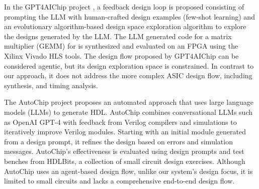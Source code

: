 In the GPT4AIChip project \cite{gpt4aigchip}, a feedback design loop is proposed consisting of prompting the LLM with human-crafted design examples (few-shot learning) and an evolutionary algorithm-based design space exploration algorithm to explore the designs generated by the LLM.  The LLM generated code for a matrix multiplier (GEMM) for is synthesized and evaluated on an FPGA using the Xilinx Vivado HLS tools. The design flow proposed by GPT4AIChip can be considered agentic, but its design exploration space is constrained. In contrast to our approach, it does not address the more complex ASIC design flow, including synthesis, and timing analysis.

The AutoChip \cite{autochip} project proposes an automated approach that uses large language models (LLMs) to generate HDL. AutoChip combines conversational LLMs such as OpenAI GPT-4 with feedback from Verilog compilers and simulations to iteratively improve Verilog modules. Starting with an initial module generated from a design prompt, it refines the design based on errors and simulation messages. AutoChip's effectiveness is evaluated using design prompts and test benches from HDLBits, a collection of small circuit design exercises. Although AutoChip uses an agent-based design flow, unlike our system's design focus, it is limited to small circuits and lacks a comprehensive end-to-end design flow.

 
